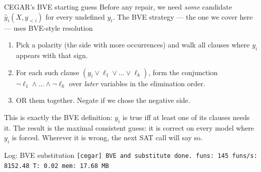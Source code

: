 \documentclass[aspectratio=169]{beamer}
\begin{document}
\begin{frame}{CEGAR's BVE starting guess}
  Before any repair, we need \emph{some} candidate $\hat y_i(X, y_{<i})$
  for every undefined $y_i$. The BVE strategy --- the one we
  cover here --- uses BVE-style resolution
  \medskip

  \begin{enumerate}\setlength{\itemsep}{1pt}
    \item Pick a polarity (the side with more occurrences) and walk all
          clauses where $y_i$ appears with that sign.
    \item For each such clause $(y_i \vee \ell_1 \vee \dots \vee \ell_k)$,
          form the conjunction $\neg\ell_1 \wedge \dots \wedge \neg\ell_k$
          over \emph{later} variables in the elimination order.
    \item OR them together. Negate if we chose the negative side.
  \end{enumerate}
  \medskip

  This is exactly the BVE definition: $y_i$ is true iff at least one of
  its clauses needs it. The result is the \alert{maximal} consistent
  guess: it is correct on every model where $y_i$ is forced. Wherever it
  is wrong, the next SAT call will say so.
  \medskip

  \begin{exampleblock}{\small Log: BVE substitution}
  \scriptsize
  \texttt{[cegar] BVE and substitute done. funs: 145 funs/s: 8152.48 T: 0.02 mem: 17.68 MB}
  \end{exampleblock}
\end{frame}
\end{document}
